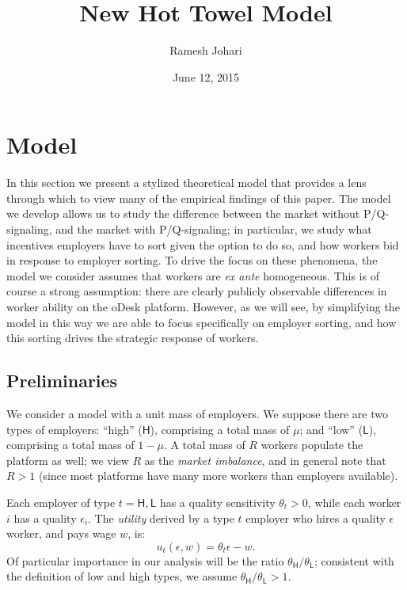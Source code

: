 \documentclass[11pt]{article}
\title{New Hot Towel Model}
\author{Ramesh Johari}
\date{June 12, 2015}
\renewcommand{\H}{\ensuremath{\mathsf{H}}}
\renewcommand{\L}{\ensuremath{\mathsf{L}}}
\newcommand{\hottowel}{P/Q-signaling}
\begin{document}
\maketitle

\section{Model}

In this section we present a stylized theoretical model that provides a lens through which to view many of the empirical findings of this paper.
The model we develop allows us to study the difference between the market without  \hottowel, and the market with \hottowel;
in particular, we study what incentives employers have to sort given the option to do so, and how workers bid in response to employer sorting.
To drive the focus on these phenomena, the model we consider assumes that workers are {\em ex ante} homogeneous.
This is of course a strong assumption: there are clearly publicly observable differences in worker ability on the oDesk platform.
However, as we will see, by simplifying the model in this way we are able to focus specifically on employer sorting, and how this sorting drives the strategic response of workers.

\subsection{Preliminaries}

We consider a model with a unit mass of employers.
We suppose there are two types of employers: ``high'' ($\H$), comprising a total mass of $\mu$;
and ``low'' ($\L$), comprising a total mass of $1-\mu$.
A total mass of $R$ workers populate the platform as well; we view $R$ as the {\em market imbalance},
and in general note that $R > 1$ (since most platforms have many more workers than employers available).

Each employer of type $t =\H, \L$ has a quality sensitivity $\theta_t > 0$, while each worker $i$ has a quality $\epsilon_i$.
The {\em utility} derived by a type $t$ employer who hires a quality $\epsilon$ worker, and pays wage $w$, is:
\begin{equation}
\label{eq:employer_util}
u_t(\epsilon, w) = \theta_t \epsilon - w.
\end{equation}
Of particular importance in our analysis will be the ratio $\theta_\H/\theta_\L$;
consistent with the definition of low and high types, we assume $\theta_\H/\theta_\L > 1$.  
\end{document}
